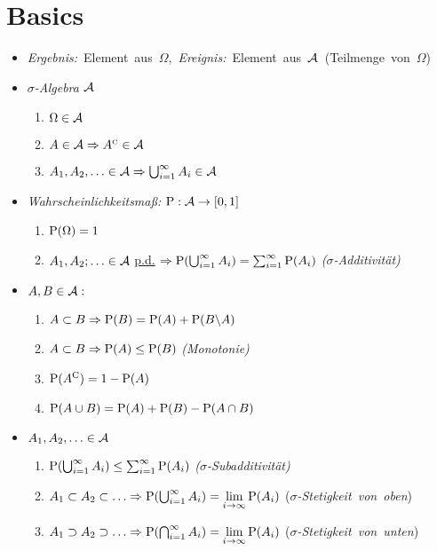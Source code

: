 \section{Basics}

\begin{itemize}
\item \mbox{\textit{Ergebnis:} Element aus $\Omega$, 
\textit{Ereignis: } Element aus $\A$ (Teilmenge von $\Omega$)}

\item \textit{$\sigma$-Algebra $\A$}
	\begin{enumerate}
	\item $\Omega\in\A$
	\item $A\in\A \Rightarrow \compl{A}\in\A$
	\item $A_1, A_2,\ldots\in\A \Rightarrow \bigcup_{i=1}^{\infty} A_i \in\A$
	\end{enumerate}
	
\item \textit{Wahrscheinlichkeitsmaß:} $\P:\A\rightarrow [0,1]$
	\begin{enumerate}
	\item $\P(\Omega)=1$
	\item $A_1,A_2;\ldots\in\A$ \underline{p.d.} 
	$\Rightarrow \P(\bigcup_{i=1}^{\infty} A_i)
	= \sum_{i=1}^{\infty}\P(A_i)$ \hfill\textit{($\sigma$-Additivität)}
	\end{enumerate}

\item $A,B\in\A:$
	\begin{enumerate}
	\item $A\subset B \Rightarrow \P(B)=\P(A)+\P(B\backslash A)$
	\item $A\subset B \Rightarrow \P(A)\leq\P(B)$
	\hfill\textit{(Monotonie)}
	\item $\P(A^{\text{C}})=1-\P(A)$
	\item $\P(A\cup B) = \P(A)+\P(B)-\P(A\cap B)$
	\end{enumerate}
	
\item $A_1,A_2,\ldots\in\A$
	\begin{enumerate}
	\item $\P(\bigcup_{i=1}^{\infty} A_i)\leq\sum_{i=1}^{\infty} \P(A_i)$ 
	\hfill\textit{($\sigma$-Subadditivität)}
	\item $A_1\subset A_2\subset\ldots \Rightarrow 
	\P(\bigcup_{i=1}^{\infty} A_i)=\lim\limits_{i\to\infty} \P(A_i)$
	\hfill\mbox{(\textit{$\sigma$-Stetigkeit von oben})}
	\item $A_1 \supset A_2\supset\ldots \Rightarrow
	\P(\bigcap_{i=1}^{\infty} A_i)=\lim\limits_{i\to\infty} \P(A_i)$
	\hfill\mbox{(\textit{$\sigma$-Stetigkeit von unten})}
	\end{enumerate}


\end{itemize}
